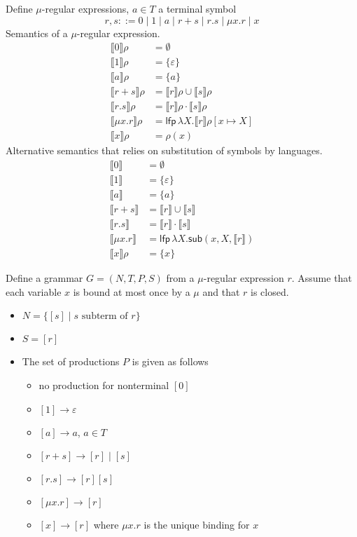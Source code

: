 \documentclass[11pt]{article}
\newcommand\Sem[1]{\llbracket#1\rrbracket}
\newcommand\LFP{\ensuremath{\mathsf{lfp}}}
\newcommand\SUB{\ensuremath{\mathsf{sub}}}
\begin{document}
Define $\mu$-regular expressions, $a\in T$ a terminal symbol
\begin{displaymath}
  r,s ::= 0 \mid 1 \mid a \mid r+s \mid r.s \mid \mu x.r \mid x
\end{displaymath}
Semantics of a $\mu$-regular expression.
\begin{align*}
  \Sem{0}\rho &= \emptyset\\
  \Sem{1}\rho &= \{ \varepsilon \}\\
  \Sem{a}\rho &= \{ a \} \\
  \Sem{r+s}\rho &= \Sem{r}\rho \cup \Sem{s}\rho \\
  \Sem{r.s}\rho &= \Sem{r}\rho \cdot \Sem{s}\rho \\
  \Sem{\mu x. r}\rho &= \LFP\, \lambda X. \Sem{r}\rho[x \mapsto X]\\
  \Sem{x}\rho &=\rho(x) 
\end{align*}
Alternative semantics that relies on substitution of symbols by languages.
\begin{align*}
  \Sem{0} &= \emptyset\\
  \Sem{1} &= \{ \varepsilon \}\\
  \Sem{a} &= \{ a \} \\
  \Sem{r+s} &= \Sem{r} \cup \Sem{s} \\
  \Sem{r.s} &= \Sem{r} \cdot \Sem{s} \\
  \Sem{\mu x. r} &= \LFP\, \lambda X. \SUB(x, X, \Sem{r})\\
  \Sem{x}\rho &= \{ x\}
\end{align*}

Define a grammar $G= (N, T, P, S)$ from a $\mu$-regular expression $r$.
Assume that each variable $x$ is bound at most once by a $\mu$ and that $r$ is closed.
\begin{itemize}
\item $N = \{ [s] \mid s \text{ subterm of }r \}$
\item $S = [r]$
\item The set of productions $P$ is given as follows
  \begin{itemize}
  \item no production for nonterminal $[0]$
  \item $[1] \to \varepsilon$
  \item $[a] \to a$, $a\in T$
  \item $[r+s] \to [r] \mid [s]$
  \item $[r.s] \to [r][s]$
  \item $[\mu x.r] \to [r]$
  \item $[x] \to [r]$ where $\mu x.r$ is the unique binding for $x$
  \end{itemize}
\end{itemize}
\end{document}
